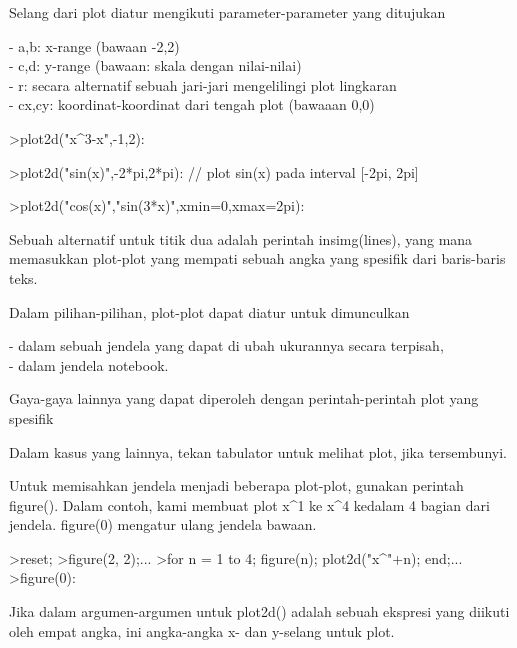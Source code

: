 \documentclass[a4paper,10pt]{article}
\begin{document}
\begin{eulernotebook}
\begin{eulercomment}
\begin{eulercomment}
\begin{eulercomment}
\begin{eulercomment}
\begin{eulercomment}
Selang dari plot diatur mengikuti parameter-parameter yang ditujukan

- a,b: x-range (bawaan -2,2)\\
- c,d: y-range (bawaan: skala dengan nilai-nilai)\\
- r: secara alternatif sebuah jari-jari mengelilingi plot lingkaran\\
- cx,cy: koordinat-koordinat dari tengah plot (bawaaan 0,0)
\end{eulercomment}
\begin{eulerprompt}
>plot2d("x^3-x",-1,2):
\end{eulerprompt}
\begin{eulerprompt}
>plot2d("sin(x)",-2*pi,2*pi): // plot sin(x) pada interval [-2pi, 2pi]
\end{eulerprompt}
\begin{eulerprompt}
>plot2d("cos(x)","sin(3*x)",xmin=0,xmax=2pi):
\end{eulerprompt}
\begin{eulercomment}
Sebuah alternatif untuk titik dua adalah perintah insimg(lines), yang mana memasukkan plot-plot yang mempati
sebuah angka yang spesifik dari baris-baris teks.

Dalam pilihan-pilihan, plot-plot dapat diatur untuk dimunculkan

- dalam sebuah jendela yang dapat di ubah ukurannya secara terpisah,\\
- dalam jendela notebook.

Gaya-gaya lainnya yang dapat diperoleh dengan perintah-perintah plot yang spesifik

Dalam kasus yang lainnya, tekan tabulator untuk melihat plot, jika tersembunyi.

Untuk memisahkan jendela menjadi beberapa plot-plot, gunakan perintah figure(). Dalam contoh, kami membuat plot
x\textasciicircum{}1 ke x\textasciicircum{}4 kedalam 4 bagian dari jendela. figure(0) mengatur ulang jendela bawaan.
\end{eulercomment}
\begin{eulerprompt}
>reset;
>figure(2, 2);...
>for n = 1 to 4; figure(n); plot2d("x^"+n); end;...
>figure(0):
\end{eulerprompt}
\begin{eulercomment}
Jika dalam argumen-argumen untuk plot2d() adalah sebuah ekspresi yang diikuti oleh empat angka, ini angka-angka
x- dan y-selang untuk plot.


\end{eulercomment}
\end{eulercomment}
\end{eulercomment}
\end{eulercomment}
\end{eulercomment}
\end{eulernotebook}
\end{document}
